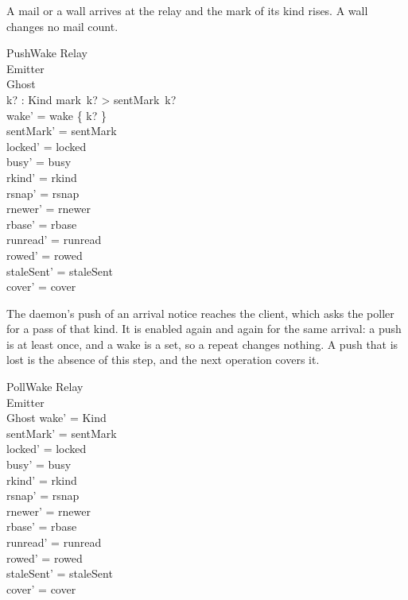 \documentclass[a4paper,10pt,fleqn]{article}
\begin{document}
A mail or a wall arrives at the relay and the mark of its kind rises.  A wall
changes no mail count.

\begin{schema}{PushWake}
  \Xi Relay \\
  \Delta Emitter \\
  \Xi Ghost \\
  k? : Kind
  \where
  mark~k? > sentMark~k? \\
  wake' = wake \cup \{ k? \} \\
  sentMark' = sentMark \\
  locked' = locked \\
  busy' = busy \\
  rkind' = rkind \\
  rsnap' = rsnap \\
  rnewer' = rnewer \\
  rbase' = rbase \\
  runread' = runread \\
  rowed' = rowed \\
  staleSent' = staleSent \\
  cover' = cover
\end{schema}

The daemon's push of an arrival notice reaches the client, which asks the poller
for a pass of that kind.  It is enabled again and again for the same arrival: a
push is at least once, and a wake is a set, so a repeat changes nothing.  A push
that is lost is the absence of this step, and the next operation covers it.

\begin{schema}{PollWake}
  \Xi Relay \\
  \Delta Emitter \\
  \Xi Ghost
  \where
  wake' = Kind \\
  sentMark' = sentMark \\
  locked' = locked \\
  busy' = busy \\
  rkind' = rkind \\
  rsnap' = rsnap \\
  rnewer' = rnewer \\
  rbase' = rbase \\
  runread' = runread \\
  rowed' = rowed \\
  staleSent' = staleSent \\
  cover' = cover
\end{schema}
\end{document}
